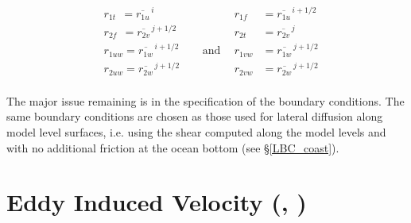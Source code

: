 \documentclass[NEMO_book]{subfiles}
\begin{document}
\begin{equation} \label{Eq_ldfslp_dyn}
\begin{aligned}
&r_{1t}\ \ = \overline{r_{1u}}^{\,i}       &&&    r_{1f}\ \ &= \overline{r_{1u}}^{\,i+1/2} \\
&r_{2f} \ \ = \overline{r_{2v}}^{\,j+1/2} &&& 	r_{2t}\ &= \overline{r_{2v}}^{\,j} \\
&r_{1uw}  = \overline{r_{1w}}^{\,i+1/2} &&\ \ \text{and} \ \ &   r_{1vw}&= \overline{r_{1w}}^{\,j+1/2} \\
&r_{2uw}= \overline{r_{2w}}^{\,j+1/2} &&&         r_{2vw}&= \overline{r_{2w}}^{\,j+1/2}\\
\end{aligned}
\end{equation}

The major issue remaining is in the specification of the boundary conditions. 
The same boundary conditions are chosen as those used for lateral 
diffusion along model level surfaces, i.e. using the shear computed along 
the model levels and with no additional friction at the ocean bottom (see 
\S\ref{LBC_coast}).


\section  [Eddy Induced Velocity (\textit{traadv\_eiv}, \textit{ldfeiv})]
		{Eddy Induced Velocity (, )}
\label{LDF_eiv}
\end{document}
